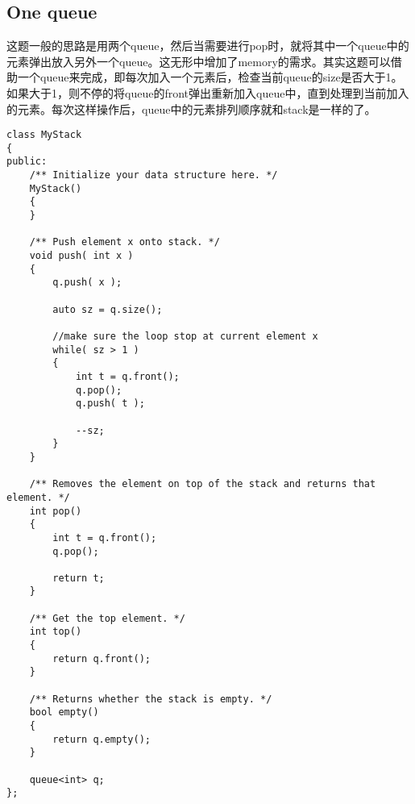 \subsection{One queue}
这题一般的思路是用两个queue，然后当需要进行pop时，就将其中一个queue中的元素弹出放入另外一个queue。这无形中增加了memory的需求。其实这题可以借助一个queue来完成，即每次加入一个元素后，检查当前queue的size是否大于1。 如果大于1，则不停的将queue的front弹出重新加入queue中，直到处理到当前加入的元素。每次这样操作后，queue中的元素排列顺序就和stack是一样的了。
\setcounter{lstlisting}{0}
\begin{lstlisting}[style=customc, caption={Queue}]
class MyStack
{
public:
    /** Initialize your data structure here. */
    MyStack()
    {
    }

    /** Push element x onto stack. */
    void push( int x )
    {
        q.push( x );

        auto sz = q.size();

		//make sure the loop stop at current element x
        while( sz > 1 )
        {
            int t = q.front();
            q.pop();
            q.push( t );

            --sz;
        }
    }

    /** Removes the element on top of the stack and returns that element. */
    int pop()
    {
        int t = q.front();
        q.pop();

        return t;
    }

    /** Get the top element. */
    int top()
    {
        return q.front();
    }

    /** Returns whether the stack is empty. */
    bool empty()
    {
        return q.empty();
    }

    queue<int> q;
};


\end{lstlisting}